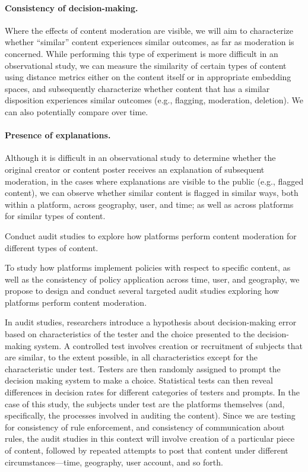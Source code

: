 \paragraph{Consistency of decision-making.} Where the effects of content
moderation are visible, we will aim to characterize whether ``similar''
content experiences similar outcomes, as far as moderation is concerned. While
performing this type of experiment is more difficult in an observational
study, we can measure the similarity of certain types of content using
distance metrics either on the content itself or in appropriate embedding spaces, 
and subsequently characterize whether content that has a
similar disposition experiences similar outcomes (e.g., flagging, moderation,
deletion). We can also potentially compare over time.

\paragraph{Presence of explanations.} Although it is difficult in an
observational study to determine whether the original creator or content
poster receives an explanation of subsequent moderation, in the cases where
explanations are visible to the public (e.g., flagged content), we can
observe whether similar content is flagged in similar ways, both within a
platform, across geography, user, and time; as well as across platforms for
similar types of content.

\begin{task}
    Conduct audit studies to explore how platforms perform
    content moderation for different types of content.
\end{task}
\noindent
To study how platforms implement policies with respect to specific content, as
well as the consistency of policy application across time, user, and
geography, we propose to design and conduct several targeted audit studies
exploring how platforms perform content moderation.

In audit studies, researchers introduce a hypothesis about
decision-making error based on characteristics of the tester and the choice
presented to the decision-making system. A controlled test involves creation
or recruitment of subjects that are similar, to the extent possible, in all
characteristics except for the characteristic under test. Testers are then
randomly assigned to prompt the decision making system to make a choice.
Statistical tests can then reveal differences in decision rates for different
categories of testers and prompts. In the case of this study, the subjects
under test are the platforms themselves (and, specifically, the processes
involved in auditing the content). Since we are testing for consistency of
rule enforcement, and consistency of communication about rules, the audit
studies in this context will involve creation of a particular piece of
content, followed by repeated attempts to post that content under different
circumstances---time, geography, user account, and so forth.

